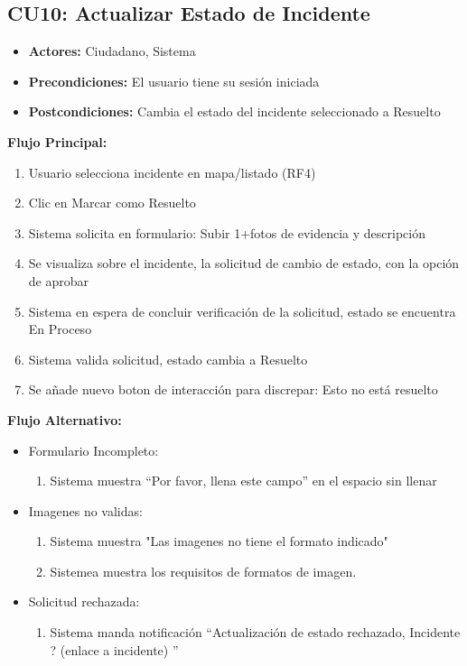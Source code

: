 \begin{multicols}{2}
\subsection*{CU10: Actualizar Estado de Incidente}
\begin{itemize}
    \item \textbf{Actores:} Ciudadano, Sistema
    \item \textbf{Precondiciones:} El usuario tiene su sesión iniciada
    \item \textbf{Postcondiciones:} Cambia el estado del incidente seleccionado a Resuelto
\end{itemize}
\textbf{Flujo Principal:}
\begin{enumerate}
    \item Usuario selecciona incidente en mapa/listado (RF4)
    \item Clic en Marcar como Resuelto
    \item Sistema solicita en formulario: Subir 1+fotos de evidencia y descripción
    \item Se visualiza sobre el incidente, la solicitud de cambio de estado, con la opción de aprobar
    \item Sistema en espera de concluir verificación de la solicitud, estado se encuentra En Proceso
    \item Sistema valida solicitud, estado cambia a Resuelto
    \item Se añade nuevo boton de interacción para discrepar: Esto no está resuelto
\end{enumerate}

\textbf{Flujo Alternativo:}
\begin{itemize}
    \item Formulario Incompleto:
    \begin{enumerate}
        \item Sistema muestra “Por favor, llena este campo” en el espacio sin llenar
    \end{enumerate}
    \item Imagenes no validas:
    \begin{enumerate}
        \item Sistema muestra "Las imagenes no tiene el formato indicado"
        \item Sistemea muestra los requisitos de formatos de imagen.
    \end{enumerate}
    \item Solicitud rechazada:
    \begin{enumerate}
        \item Sistema manda notificación ``Actualización de estado rechazado, Incidente ? (enlace a incidente) ''
    \end{enumerate}
\end{itemize}


\end{multicols}
